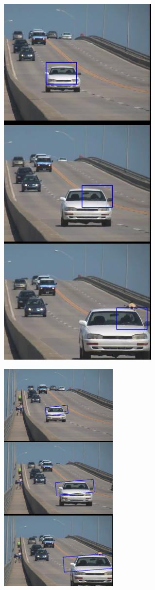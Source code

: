 \begin{figure}
  \begin{subfigure}{.5\textwidth}
    \centering
    \includegraphics[width=.45\textwidth]{images/cochemeanshift}
    \caption{}
    \label{fig:ejemplos1a}
  \end{subfigure}
  \begin{subfigure}{.4\textwidth}
    \centering
    \includegraphics[width=0.65\textwidth]{images/cochecamshift}

\end{subfigure}
\end{figure}
